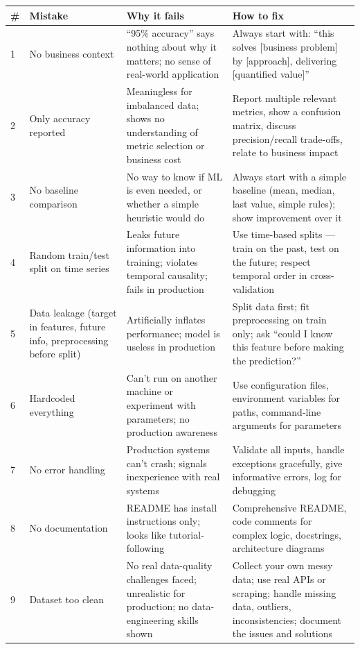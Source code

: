 \begin{longtable}{p{} p{} p{} p{}}
\toprule
\textbf{\#} & \textbf{Mistake} & \textbf{Why it fails} & \textbf{How to fix} \\
\midrule
\endhead
1 & No business context & ``95\% accuracy'' says nothing about why it matters; no sense of real-world application
& Always start with: ``this solves [business problem] by [approach], delivering [quantified value]'' \\
2 & Only accuracy reported & Meaningless for imbalanced data; shows no understanding of metric selection or
business cost & Report multiple relevant metrics, show a confusion matrix, discuss precision/recall trade-offs,
relate to business impact \\
3 & No baseline comparison & No way to know if ML is even needed, or whether a simple heuristic would do & Always
start with a simple baseline (mean, median, last value, simple rules); show improvement over it \\
4 & Random train/test split on time series & Leaks future information into training; violates temporal causality;
fails in production & Use time-based splits --- train on the past, test on the future; respect temporal order in
cross-validation \\
5 & Data leakage (target in features, future info, preprocessing before split) & Artificially inflates performance;
model is useless in production & Split data first; fit preprocessing on train only; ask ``could I know this
feature before making the prediction?'' \\
6 & Hardcoded everything & Can't run on another machine or experiment with parameters; no production awareness &
Use configuration files, environment variables for paths, command-line arguments for parameters \\
7 & No error handling & Production systems can't crash; signals inexperience with real systems & Validate all
inputs, handle exceptions gracefully, give informative errors, log for debugging \\
8 & No documentation & README has install instructions only; looks like tutorial-following & Comprehensive
README, code comments for complex logic, docstrings, architecture diagrams \\
9 & Dataset too clean & No real data-quality challenges faced; unrealistic for production; no data-engineering
skills shown & Collect your own messy data; use real APIs or scraping; handle missing data, outliers,
inconsistencies; document the issues and solutions \\

\end{longtable}
